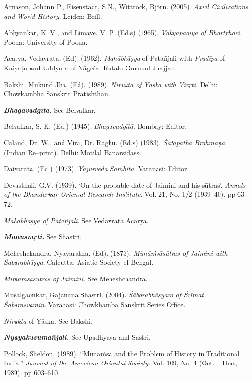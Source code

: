 \begin{thebibliography}{99}
 Arnason, Johann P., Eisenstadt, S.N., Wittrock, Björn. (2005). \textit{Axial Civilizations and World History}. Leiden: Brill.

  Abhyankar, K. V., and Limaye, V. P. (Ed.s) (1965). \textit{Vākyapadīya of Bhartṛhari}. Poona: University of Poona.

  Acarya, Vedavrata. (Ed). (1962). \textit{Mahābhāṣya} of Patañjali with \textit{Pradīpa} of Kaiyaṭa and Uddyota of Nāgeśa. Rotak: Gurukul Jhajjar.

  Bakshi, Mukund Jha, (Ed). (1989). \textit{Nirukta of Yāska with Vivṛti}. Delhi: Chowkambha Sanskrit Pratishthan.

  \textbf{\textit{Bhagavadgītā.}} See Belvalkar.

  Belvalkar, S. K. (Ed.) (1945). \textit{Bhagavadgītā}. Bombay: Editor.

  Caland, Dr. W., and Vira, Dr. Raghu. (Ed.s) (1983). \textit{Śatapatha Brāhmaṇa}. (Indian Re–print). Delhi: Motilal Banarsidass.

  Daivarata. (Ed.) (1973). \textit{Yajurveda Saṁhitā}. Varanasi: Editor.

  Devasthali, G.V. (1939). ‘On the probable date of Jaimini and his sūtras’. \textit{Annals of the Bhandarkar Oriental Research Institute}. Vol. 21, No. 1/2 (1939–40). pp 63–72.

  \textit{Mahābhāṣya of Patañjali}. See Vedavrata Acarya.

  \textbf{\textit{Manusmṛti.}} See Shastri.

  Meheshchandra, Nyayaratna. (Ed). (1873). \textit{Mīmāṁsāsūtras of Jaimini with Śabarabhāṣya}. Calcutta: Asiatic Society of Bengal.

  \textit{Mīmāṁsāsūtras of Jaimini}. See Meheshchandra.

  Musalgaonkar, Gajanana Shastri. (2004). \textit{Śābarabhāṣyam of Śrīmat Śabarasvāmin}. Varanasi: Chowkhamba Sanskrit Series Office.

  \textit{Nirukta} of Yāska. See Bakshi.

  \textbf{\textit{Nyāyakusumāñjali.}} See Upadhyaya and Sastri.

  Pollock, Sheldon. (1989). “Mīmāṁsā and the Problem of History in Traditional India.” \textit{Journal of the American Oriental Society}. Vol. 109, No. 4 (Oct. – Dec., 1989). pp 603–610.


\end{thebibliography}
